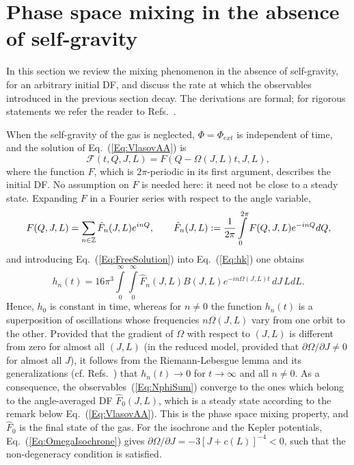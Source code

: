 \section{Phase space mixing in the absence of self-gravity}
\label{Sec:Linear}
\label{SubSec:FreeMixing}

In this section we review the mixing phenomenon in the absence of self-gravity, for an arbitrary initial DF, and discuss the rate at which the observables introduced in the previous section decay. The derivations are formal; for rigorous statements we refer the reader to Refs.~\cite{cM19,pRoS20}.

When the self-gravity of the gas is neglected, $\Phi = \Phi_{ext}$ is independent of time, and the solution of Eq.~(\ref{Eq:VlasovAA}) is
\begin{equation}
\mathcal{F}(t,Q,J,L) = F(Q - \Omega(J,L)t,J,L),
\label{Eq:FreeSolution}
\end{equation}
where the function $F$, which is $2\pi$-periodic in its first argument, describes the initial DF. No assumption on $F$ is needed here: it need not be close to a steady state. Expanding $F$ in a Fourier series with respect to the angle variable,
\begin{equation}
F(Q,J,L) = \sum\limits_{n\in\mathbb{Z}} \hat{F}_n(J,L) e^{inQ},\qquad
\hat{F}_n(J,L) := \frac{1}{2\pi}\int\limits_0^{2\pi} F(Q,J,L) e^{-inQ} dQ,
\label{Eq:FourierF}
\end{equation}
and introducing Eq.~(\ref{Eq:FreeSolution}) into Eq.~(\ref{Eq:hk}) one obtains
\begin{equation}
h_n(t) = 16\pi^3\int\limits_0^\infty\int\limits_0^\infty \hat{F}_n(J,L) B(J,L) e^{-in\Omega(J,L)t}\, dJ\, L dL.
\label{Eq:hnFree}
\end{equation}
Hence, $h_0$ is constant in time, whereas for $n\neq 0$ the function $h_n(t)$ is a superposition of oscillations whose frequencies $n\Omega(J,L)$ vary from one orbit to the other. Provided that the gradient of $\Omega$ with respect to $(J,L)$ is different from zero for almost all $(J,L)$ (in the reduced model, provided that $\partial\Omega/\partial J\neq 0$ for almost all $J$), it follows from the Riemann-Lebesgue lemma and its generalizations (cf. Refs.~\cite{cM19,pRoS20}) that $h_n(t)\to 0$ for $t\to \infty$ and all $n\neq 0$. As a consequence, the observables~(\ref{Eq:NphiSum}) converge to the ones which belong to the angle-averaged DF $\hat{F}_0(J,L)$, which is a steady state according to the remark below Eq.~(\ref{Eq:VlasovAA}). This is the phase space mixing property, and $\hat{F}_0$ is the final state of the gas. For the isochrone and the Kepler potentials, Eq.~(\ref{Eq:OmegaIsochrone}) gives $\partial\Omega/\partial J = -3[J + c(L)]^{-4} < 0$, such that the non-degeneracy condition is satisfied.

